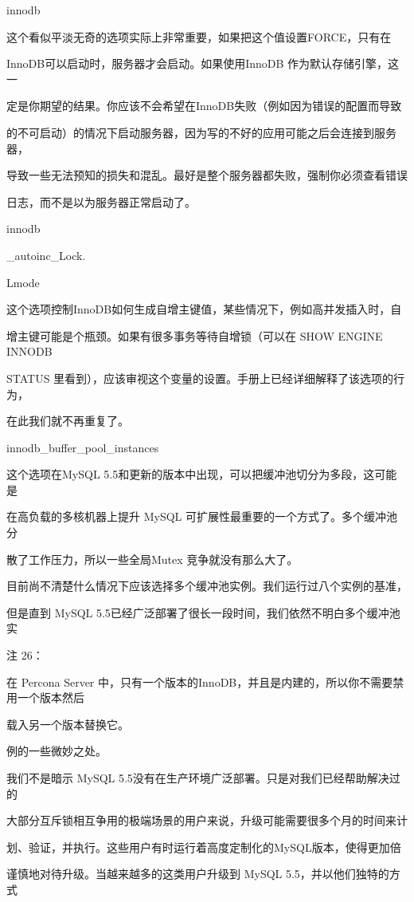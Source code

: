 innodb

这个看似平淡无奇的选项实际上非常重要，如果把这个值设置FORCE，只有在

InnoDB可以启动时，服务器才会启动。如果使用InnoDB 作为默认存储引擎，这一

定是你期望的结果。你应该不会希望在InnoDB失败（例如因为错误的配置而导致

的不可启动）的情况下启动服务器，因为写的不好的应用可能之后会连接到服务器，

导致一些无法预知的损失和混乱。最好是整个服务器都失败，强制你必须查看错误

日志，而不是以为服务器正常启动了。

innodb

\_autoinc\_Lock.

Lmode

这个选项控制InnoDB如何生成自增主键值，某些情况下，例如高并发插入时，自

增主键可能是个瓶颈。如果有很多事务等待自增锁（可以在 SHOW ENGINE INNODB

STATUS 里看到），应该审视这个变量的设置。手册上已经详细解释了该选项的行为，

在此我们就不再重复了。

innodb\_buffer\_pool\_instances

这个选项在MySQL 5.5和更新的版本中出现，可以把缓冲池切分为多段，这可能是

在高负载的多核机器上提升 MySQL 可扩展性最重要的一个方式了。多个缓冲池分

散了工作压力，所以一些全局Mutex 竞争就没有那么大了。

目前尚不清楚什么情况下应该选择多个缓冲池实例。我们运行过八个实例的基准，

但是直到 MySQL 5.5已经广泛部署了很长一段时间，我们依然不明白多个缓冲池实

注 26：

在 Percona Server 中，只有一个版本的InnoDB，并且是内建的，所以你不需要禁用一个版本然后

载入另一个版本替换它。

例的一些微妙之处。

我们不是暗示 MySQL 5.5没有在生产环境广泛部署。只是对我们已经帮助解决过的

大部分互斥锁相互争用的极端场景的用户来说，升级可能需要很多个月的时间来计

划、验证，并执行。这些用户有时运行着高度定制化的MySQL版本，使得更加倍

谨慎地对待升级。当越来越多的这类用户升级到 MySQL 5.5，并以他们独特的方式

